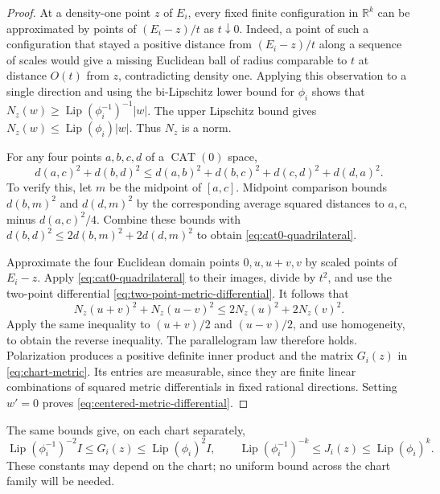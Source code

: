 \documentclass[11pt]{article}
\numberwithin{equation}{section}
\theoremstyle{definition}
\theoremstyle{remark}
\begin{document}
\begin{proof}
At a density-one point \(z\) of \(E_i\), every fixed finite configuration
in \(\mathbb R^k\) can be approximated by points of \((E_i-z)/t\) as
\(t\downarrow0\). Indeed, a point of such a configuration that stayed
a positive distance from \((E_i-z)/t\) along a sequence of scales would
give a missing Euclidean ball of radius comparable to \(t\) at distance
\(O(t)\) from \(z\), contradicting density one. Applying this observation
to a single direction and using the bi-Lipschitz lower bound for
\(\phi_i\) shows that \(N_z(w)\ge\operatorname{Lip}(\phi_i^{-1})^{-1}|w|\).
The upper Lipschitz bound gives \(N_z(w)\le\operatorname{Lip}(\phi_i)|w|\).
Thus \(N_z\) is a norm.

For any four points \(a,b,c,d\) of a \(\operatorname{CAT}(0)\) space,
\begin{equation}
\label{eq:cat0-quadrilateral}
 d(a,c)^2+d(b,d)^2
 \le d(a,b)^2+d(b,c)^2+d(c,d)^2+d(d,a)^2.
\end{equation}
To verify this, let \(m\) be the midpoint of \([a,c]\). Midpoint
comparison bounds \(d(b,m)^2\) and \(d(d,m)^2\) by the corresponding
average squared distances to \(a,c\), minus \(d(a,c)^2/4\).
Combine these bounds with
\(d(b,d)^2\le2d(b,m)^2+2d(d,m)^2\) to obtain
\eqref{eq:cat0-quadrilateral}.

Approximate the four Euclidean domain points \(0,u,u+v,v\) by scaled
points of \(E_i-z\). Apply \eqref{eq:cat0-quadrilateral} to their images,
divide by \(t^2\), and use the two-point differential
\eqref{eq:two-point-metric-differential}. It follows that
\[
 N_z(u+v)^2+N_z(u-v)^2\le2N_z(u)^2+2N_z(v)^2.
\]
Apply the same inequality to \((u+v)/2\) and \((u-v)/2\), and use
homogeneity, to obtain the reverse inequality. The parallelogram law
therefore holds. Polarization produces a positive definite inner product
and the matrix \(G_i(z)\) in \eqref{eq:chart-metric}. Its entries are
measurable, since they are finite linear combinations of squared metric
differentials in fixed rational directions. Setting \(w'=0\) proves
\eqref{eq:centered-metric-differential}.
\end{proof}

The same bounds give, on each chart separately,
\begin{equation}
\label{eq:chart-metric-bounds}
 \operatorname{Lip}(\phi_i^{-1})^{-2}I\le G_i(z)\le\operatorname{Lip}(\phi_i)^2I,
 \qquad
 \operatorname{Lip}(\phi_i^{-1})^{-k}\le J_i(z)\le\operatorname{Lip}(\phi_i)^k.
\end{equation}
These constants may depend on the chart; no uniform bound across the
chart family will be needed.
\end{document}
